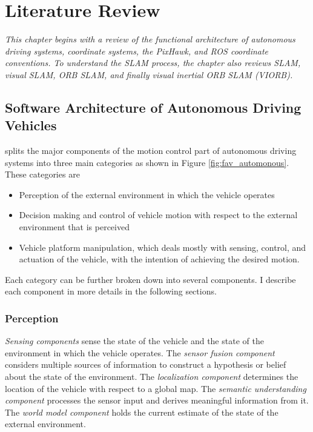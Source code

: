 \setlength{\footskip}{8mm}

\chapter{Literature Review} 
\label{ch:literature-review}

\textit{This chapter begins with a review of the functional architecture of autonomous driving systems, coordinate systems, the PixHawk, and ROS coordinate conventions. To understand the SLAM process, the chapter also reviews SLAM, visual SLAM, ORB SLAM, and finally visual inertial ORB SLAM (VIORB).} 

\section{Software Architecture of Autonomous Driving Vehicles}
\label{section-name-in-literature-review}

 splits the major components of the motion control part of autonomous driving systems into three main categories as shown in Figure \ref{fig:fav_automonous}. These categories are

\begin{itemize}
	\item Perception of the external environment in which the vehicle operates
	\item Decision making and control of vehicle motion with respect to the external environment that is perceived
	\item Vehicle platform manipulation, which deals mostly with sensing, control, and actuation of the vehicle, with the intention of achieving the desired motion.
\end {itemize}

Each category can be further broken down into several components. I describe each component in more details in the following sections.

\subsection{Perception}

\textit{Sensing components} sense the state of the vehicle and the state of the environment in which the vehicle operates. The \textit{sensor fusion component} considers multiple sources of information to construct a hypothesis or belief about the state of the environment. The \textit{localization component} determines the location of the vehicle with respect to a global map. The \textit{semantic understanding component} processes the sensor input and derives meaningful information from it. The \textit{world model component} holds the current estimate of the state of the external environment.


